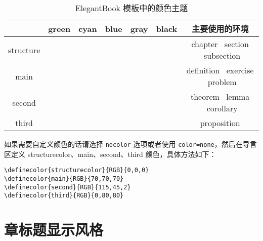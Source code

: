 \documentclass[cn,11pt]{elegantbook}
\begin{document}
\begin{table}[htbp]
\caption{ElegantBook 模板中的颜色主题\label{tab:color thm}}
\centering
\begin{tabular}{ccccccc}
\toprule
	        & \textcolor{structure1}{green} 
	        & \textcolor{structure2}{cyan} 
	        & \textcolor{structure3}{blue}
	        & \textcolor{structure4}{gray} 
	        & \textcolor{structure5}{black} 
	        & 主要使用的环境\\
\midrule
structure & \makecell{{\color{structure1}\rule{1cm}{1cm}}}
				& \makecell{{\color{structure2}\rule{1cm}{1cm}}}
				& \makecell{{\color{structure3}\rule{1cm}{1cm}}} 
				& \makecell{{\color{structure4}\rule{1cm}{1cm}}} 
				& \makecell{{\color{structure5}\rule{1cm}{1cm}}} 
				& chapter \ section \ subsection \\

main      & \makecell{{\color{main1}\rule{1cm}{1cm}}}
				& \makecell{{\color{main2}\rule{1cm}{1cm}}}
				& \makecell{{\color{main3}\rule{1cm}{1cm}}}
				& \makecell{{\color{main4}\rule{1cm}{1cm}}}
				& \makecell{{\color{main5}\rule{1cm}{1cm}}}
				& definition \ exercise \ problem \\

second    & \makecell{{\color{second1}\rule{1cm}{1cm}}}
				& \makecell{{\color{second2}\rule{1cm}{1cm}}}
				& \makecell{{\color{second3}\rule{1cm}{1cm}}}
				& \makecell{{\color{second4}\rule{1cm}{1cm}}}
				& \makecell{{\color{second5}\rule{1cm}{1cm}}}
				& theorem \ lemma \ corollary\\

third     & \makecell{{\color{third1}\rule{1cm}{1cm}}}
				& \makecell{{\color{third2}\rule{1cm}{1cm}}}
				& \makecell{{\color{third3}\rule{1cm}{1cm}}}
				& \makecell{{\color{third4}\rule{1cm}{1cm}}}
				& \makecell{{\color{third5}\rule{1cm}{1cm}}}
				& proposition\\
\bottomrule
\end{tabular}
\end{table}

如果需要自定义颜色的话请选择 \lstinline{nocolor} 选项或者使用 \lstinline{color=none}，然后在导言区定义 structurecolor、main、second、third 颜色，具体方法如下：
\begin{lstlisting}
\definecolor{structurecolor}{RGB}{0,0,0}
\definecolor{main}{RGB}{70,70,70}    
\definecolor{second}{RGB}{115,45,2}    
\definecolor{third}{RGB}{0,80,80}   
\end{lstlisting}


\section{章标题显示风格}
\end{document}
